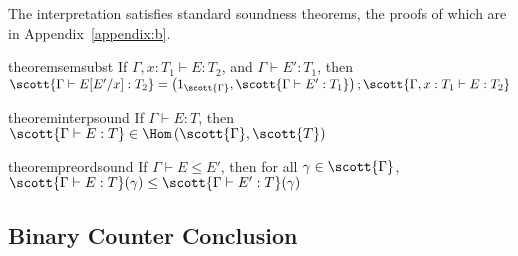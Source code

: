 The interpretation satisfies standard soundness theorems, the 
proofs of which 
are in Appendix~\ref{appendix:b}.%


\begin{restatable}[Compositionality]{theorem}{semsubst}
\label{thm:sem-subst}
If $\Gamma, x : T_1 \vdash E : T_2$, and $\Gamma \vdash E' : T_1$, then $\scott{\Gamma \vdash E[E'/x] : T_2} =  \left(1_{\scott{\Gamma}},\scott{\Gamma \vdash E' : T_1}\right) ; \scott{\Gamma, x:T_1 \vdash E : T_2}$
\end{restatable}


\begin{restatable}{theorem}{interpsound}
\label{thm:term-soundness}
If $\Gamma \vdash E : T$, then $\scott{\Gamma \vdash E : T} \in \Hom\left(\scott{\Gamma},\scott{T}\right)$
\end{restatable}


\begin{restatable}{theorem}{preordsound}
\label{thm:soundness-inequality}
If $\Gamma \vdash E \leq E'$, then for all $\gamma \in \scott{\Gamma}$, $\scott{\Gamma \vdash E : T}(\gamma) \leq \scott{\Gamma \vdash E' : T}(\gamma)$
\end{restatable}

\subsection{Binary Counter Conclusion}


